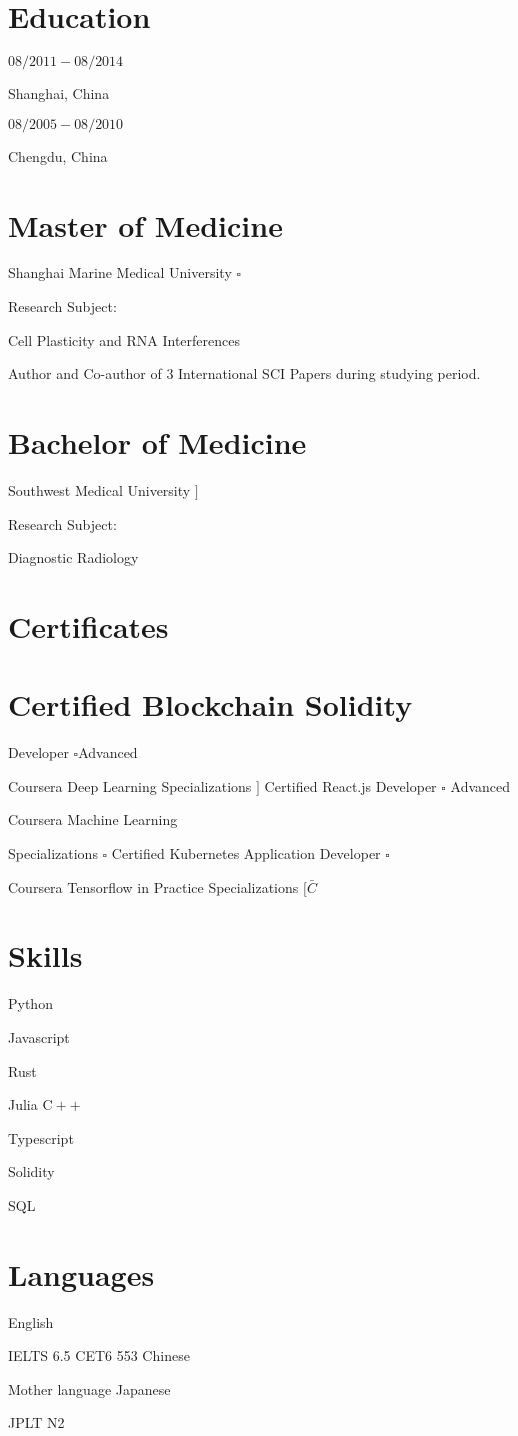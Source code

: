 \documentclass[10pt]{article}
\begin{document}
\section{Education}
$08 / 2011-08 / 2014$

Shanghai, China

$08 / 2005-08 / 2010$

Chengdu, China

\section{Master of Medicine}
Shanghai Marine Medical University $\square$

Research Subject:

Cell Plasticity and RNA Interferences

Author and Co-author of 3 International SCI Papers during studying period.

\section{Bachelor of Medicine}
Southwest Medical University $]$

Research Subject:

Diagnostic Radiology

\section{Certificates}
\section{Certified Blockchain Solidity}
 Developer $\square$Advanced

Coursera Deep Learning Specializations $]$ Certified React.js Developer $\square$ Advanced

Coursera Machine Learning

Specializations $\square$ Certified Kubernetes Application Developer $\square$

Coursera Tensorflow in Practice Specializations $[\bar{C}$

\section{Skills}
Python

Javascript

Rust

Julia $\mathrm{C}++$

Typescript

Solidity

SQL

\section{Languages}
English

IELTS 6.5 CET6 553 Chinese

Mother language Japanese

JPLT N2
\end{document}

